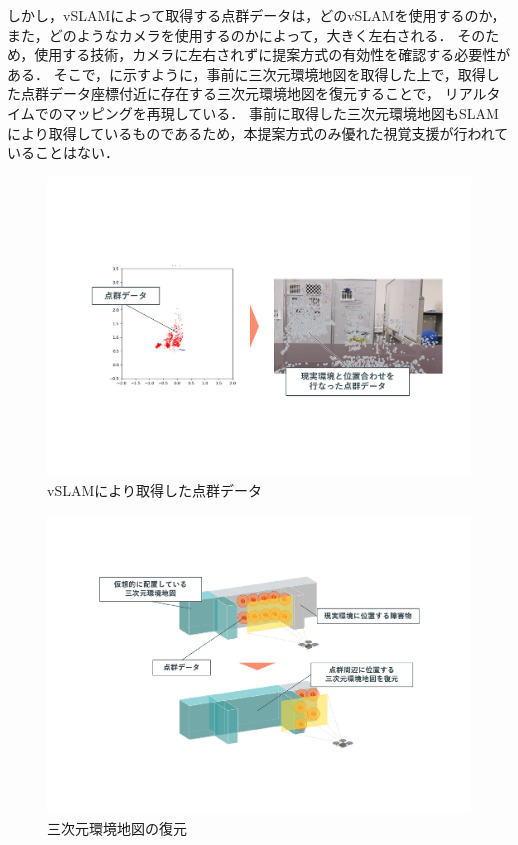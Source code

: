 \documentclass[a4paper,11pt]{ujreport}
\begin{document}
しかし，vSLAMによって取得する点群データは，どのvSLAMを使用するのか，また，どのようなカメラを使用するのかによって，大きく左右される．
そのため，使用する技術，カメラに左右されずに提案方式の有効性を確認する必要性がある．
そこで，に示すように，事前に三次元環境地図を取得した上で，取得した点群データ座標付近に存在する三次元環境地図を復元することで，
リアルタイムでのマッピングを再現している．
事前に取得した三次元環境地図もSLAMにより取得しているものであるため，本提案方式のみ優れた視覚支援が行われていることはない．



\begin{figure}[!tb]
  \centering
  \includegraphics[width=0.9\linewidth]{img/03_pointcloud.pdf}
  \caption{vSLAMにより取得した点群データ}
  \label{fig:03_pointcloud}
\end{figure}

\begin{figure}[!tb]
  \centering
  \includegraphics[width=0.9\linewidth]{img/03_restore.pdf}
  \caption{三次元環境地図の復元}
  \label{fig:03_restore}
\end{figure}
\end{document}
